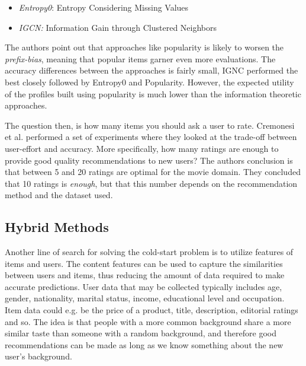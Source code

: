 \begin{itemize}
\item \emph{Entropy0}: Entropy Considering Missing Values
\item \emph{IGCN:} Information Gain through Clustered Neighbors
\end{itemize}

The authors point out that approaches like popularity is likely to worsen the
\emph{prefix-bias}, meaning that popular items garner even more evaluations.
The accuracy differences between the approaches is fairly small, IGNC performed
the best closely followed by Entropy0 and Popularity. However, the expected
utility of the profiles built using popularity is much lower than the
information theoretic approaches.\newline

The question then, is how many items you should ask a user to rate. Cremonesi
et al. \cite{Cremonesi2012} performed a set of experiments where they looked
at the trade-off between user-effort and accuracy. More specifically, how many
ratings are enough to provide good quality recommendations to new users? The
authors conclusion is that between 5 and 20 ratings are optimal for the movie
domain. They concluded that 10 ratings is \emph{enough}, but that this number
depends on the recommendation method and the dataset used.

\subsection{Hybrid Methods}


Another line of search for solving the cold-start problem is to utilize
features of items and users. The content features can be used to capture the
similarities between users and items, thus reducing the amount of data required
to make accurate predictions. User data that may be collected typically
includes age, gender, nationality, marital status, income, educational level
and occupation. Item data could e.g. be the price of a product, title,
description, editorial ratings and so. The idea is that people with a more
common background share a more similar taste than someone with a random
background, and therefore good recommendations can be made as long as we know
something about the new user's background.

